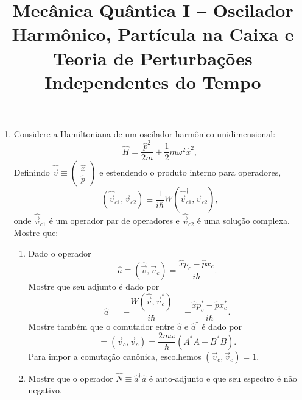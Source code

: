 \newif\ifuseseminar
\useseminartrue


\title{Mecânica Quântica I -- Oscilador Harmônico, Partícula na Caixa e Teoria de Perturbações Independentes do Tempo}






\begin{enumerate}
    \item Considere a Hamiltoniana de um oscilador harmônico unidimensional:
          \begin{equation*}
              \hat{H} = \frac{\hat{p}^2}{2m} + \frac{1}{2}m\omega^2\hat{x}^2,
          \end{equation*}
          Definindo $\hat{\vec{v}} \equiv \begin{pmatrix} \hat{x} \\
                  \hat{p}\end{pmatrix}$ e estendendo o produto interno para operadores,
          $$\left(\hat{\vec{v}}_{c1}, \vec{v}_{c2}\right) \equiv
              \frac{1}{i\hbar}W(\hat{\vec{v}}_{c1}^\dagger, \vec{v}_{c2}),$$ onde
          $\hat{\vec{v}}_{c1}$ é um operador par de operadores e $\hat{\vec{v}}_{c2}$ é
          uma solução complexa. Mostre que:
          \begin{enumerate}
              \item Dado o operador $$\hat{a} \equiv \left(\hat{\vec{v}}, \vec{v}_c\right) =
                        \frac{\hat{x}p_c - \hat{p}x_c}{i\hbar}.$$
                    Mostre que seu adjunto é dado por
                    \begin{equation*}
                        \hat{a}^\dagger = -\frac{W(\hat{\vec{v}},\vec{v}_c^*)}{i\hbar} =
                        -\frac{\hat{x}p_c^* - \hat{p}x_c^*}{i\hbar}.
                    \end{equation*}
                    Mostre também que o comutador entre $\hat{a}$ e $\hat{a}^\dagger$ é dado por
                    \begin{equation*}
                        [\hat{a}, \hat{a}^\dagger] =
                        \left(\vec{v}_c, \vec{v}_c\right) = \frac{2m\omega}{\hbar}\left(A^*A - B^*B\right).
                    \end{equation*}
                    Para impor a comutação canônica, escolhemos $\left(\vec{v}_c, \vec{v}_c\right)=1$.
              \item Mostre que o operador $\hat{N} \equiv \hat{a}^\dagger\hat{a}$ é
                    auto-adjunto e que seu espectro é não negativo.

\end{enumerate}
\end{enumerate}
